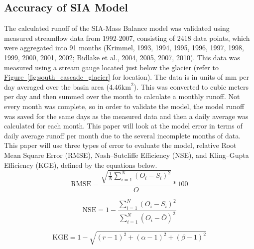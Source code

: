 \documentclass{article}
\begin{document}
\subsection{Accuracy of SIA Model}
The calculated runoff of the SIA-Mass Balance model was validated using measured streamflow data from 1992-2007, consisting of 2418 
data points, which were aggregated into 91 months (Krimmel, 1993, 1994, 1995, 1996, 1997, 1998, 1999, 2000, 2001, 2002; Bidlake et al., 2004, 2005, 2007, 2010). This data was measured using 
a stream gauge located just below the glacier (refer to \hyperref[fig:south_cascade_glacier]{Figure~\ref*{fig:south_cascade_glacier}}  for location). The data is in units of mm per day averaged over the basin area (4.46$\text{km}^2$). This was  
converted to cubic meters per day and then 
summed over the month to calculate a monthly runoff. Not every month was complete, so in order to validate the model, the model runoff was saved 
for the same days as the measured data and then a daily average was calculated for each month. 
This paper will look at the model error in terms of daily average runoff per month due to the several incomplete months of data. 
This paper will use three types of error to evaluate the model, relative Root Mean Square Error (RMSE), Nash–Sutcliffe Efficiency (NSE), and Kling–Gupta Efficiency 
(KGE), defined by the equations below. 
\begin{equation}
    \mathrm{RMSE} = \frac{\sqrt{\frac{1}{N}\sum_{i=1}^{N} \left( O_i - S_i \right)^2}}{\bar{O}}*100 \label{tab:rmse_runoff_eq}
\end{equation}

\begin{equation}
    \mathrm{NSE} = 1 - \frac{\sum_{i=1}^{N}\left( O_i - S_i \right)^2}{\sum_{i=1}^{N}\left( O_i - \bar{O} \right)^2} \label{tab:nse}
\end{equation}

\begin{equation}
    \mathrm{KGE} = 1 - \sqrt{ (r-1)^2 + (\alpha-1)^2 + (\beta-1)^2 } \label{tab:kge}
\end{equation}
\end{document}
